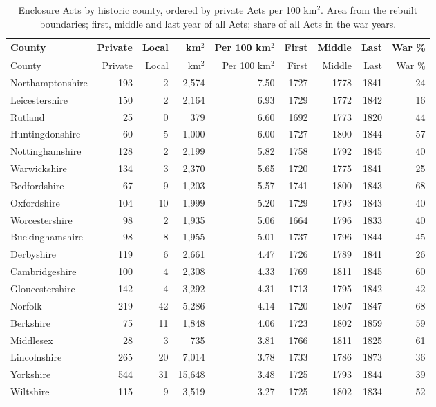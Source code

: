 \documentclass[11pt,a4paper]{article}
\begin{document}
{\footnotesize\setlength{\tabcolsep}{4pt}\begin{longtable}{lrrrrrrrr}\caption{Enclosure Acts by historic county, ordered by private Acts per 100 km$^2$. Area from the rebuilt boundaries; first, middle and last year of all Acts; share of all Acts in the war years.}\label{tab:counties}\\\toprule County & Private & Local & km$^2$ & Per 100 km$^2$ & First & Middle & Last & War \%\\\midrule\endfirsthead\toprule County & Private & Local & km$^2$ & Per 100 km$^2$ & First & Middle & Last & War \%\\\midrule\endhead
Northamptonshire & 193 & 2 & 2,574 & 7.50 & 1727 & 1778 & 1841 & 24\\
Leicestershire & 150 & 2 & 2,164 & 6.93 & 1729 & 1772 & 1842 & 16\\
Rutland & 25 & 0 & 379 & 6.60 & 1692 & 1773 & 1820 & 44\\
Huntingdonshire & 60 & 5 & 1,000 & 6.00 & 1727 & 1800 & 1844 & 57\\
Nottinghamshire & 128 & 2 & 2,199 & 5.82 & 1758 & 1792 & 1845 & 40\\
Warwickshire & 134 & 3 & 2,370 & 5.65 & 1720 & 1775 & 1841 & 25\\
Bedfordshire & 67 & 9 & 1,203 & 5.57 & 1741 & 1800 & 1843 & 68\\
Oxfordshire & 104 & 10 & 1,999 & 5.20 & 1729 & 1793 & 1843 & 40\\
Worcestershire & 98 & 2 & 1,935 & 5.06 & 1664 & 1796 & 1833 & 40\\
Buckinghamshire & 98 & 8 & 1,955 & 5.01 & 1737 & 1796 & 1844 & 45\\
Derbyshire & 119 & 6 & 2,661 & 4.47 & 1726 & 1789 & 1841 & 26\\
Cambridgeshire & 100 & 4 & 2,308 & 4.33 & 1769 & 1811 & 1845 & 60\\
Gloucestershire & 142 & 4 & 3,292 & 4.31 & 1713 & 1795 & 1842 & 42\\
Norfolk & 219 & 42 & 5,286 & 4.14 & 1720 & 1807 & 1847 & 68\\
Berkshire & 75 & 11 & 1,848 & 4.06 & 1723 & 1802 & 1859 & 59\\
Middlesex & 28 & 3 & 735 & 3.81 & 1766 & 1811 & 1825 & 61\\
Lincolnshire & 265 & 20 & 7,014 & 3.78 & 1733 & 1786 & 1873 & 36\\
Yorkshire & 544 & 31 & 15,648 & 3.48 & 1725 & 1793 & 1844 & 39\\
Wiltshire & 115 & 9 & 3,519 & 3.27 & 1725 & 1802 & 1834 & 52\\

\end{longtable}}
\end{document}
